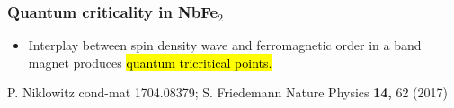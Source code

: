 \begin{frame}[label=NbFe2qtcp]
  \frametitle{Quantum criticality in NbFe$_2$}

\begin{itemize}
\item
Interplay between spin density wave and ferromagnetic order in a band
magnet produces \hl{quantum tricritical points.}
\end{itemize}


\vspace*{\fill}
\centerline{\makebox[\linewidth]{\rule{0.85\textwidth}{0.4pt}}}
\centerline{\scriptsize P. Niklowitz cond-mat 1704.08379; S. Friedemann Nature Physics {\bf 14,} 62 (2017)}
\end{frame}





